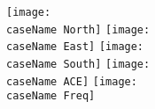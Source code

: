 \documentclass[12pt]{article}
\newcommand{\caseName}{ }
\begin{document}
	\texttt{[image: \\caseName North]}
	\texttt{[image: \\caseName East]} 
	\texttt{[image: \\caseName South]} 
	\texttt{[image: \\caseName ACE]} 
	\texttt{[image: \\caseName Freq]} 
	


		

\begin{comment}

\item Formulate feasible plan of action for casting all WECC governors to LTD governors (tgov1). Possibly:
		\begin{enumerate}
		\item Parse models of interest from dyd.
		\item Create dyd from parsed model.
		\item Automate a 'scaled' Pref step test for a one machine infinite bus in PSDS.
		\item Read and analyze output data
		\item Generate/Calculate LTD equivalent model parameters from results (this will probably use MATLAB and \verb|jfind|)
		\item Export custom dyd for LTD simulation. (PSDS would still use original the dyd, though \emph{could} use modified dyd)
		\end{enumerate}

\pagebreak
	\paragraph{Deviation Plots:} To make large numbers of comparisons easier to comprehend], deviation plots were created to show the difference between LTD and PSDS data.\\
	
	One way to think of these plots is $\text{LTD}_{data}+\text{Deviation}_{data} = \text{PSDS}_{data}$. \\(Assuming all time step issues are handled appropriately.)\\
	
	Alternatively, the deviation data could be thought of as data that is filtered out due to the larger time steps and assumptions made by LTD.\\
	

\end{comment}
\end{document}
